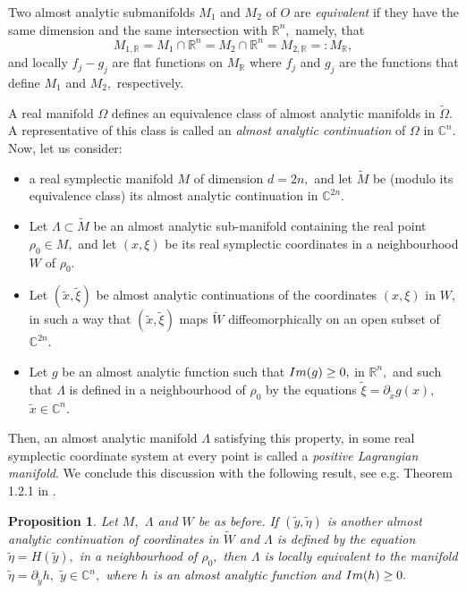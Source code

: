 \documentclass[12pt, reqno]{amsart}
\newtheorem{proposition}[theorem]{Proposition}
\theoremstyle{definition}
\theoremstyle{remark}
\numberwithin{equation}{section}
\begin{document}
Two almost analytic submanifolds $M_1$ and $M_2$ of $O$ are {\it equivalent} if they have the same dimension and the same intersection with $\mathbb{R}^n,$ namely, that $$M_{1,\mathbb{R}}=M_1\cap \mathbb{R}^n=M_2\cap \mathbb{R}^n=M_{2,\mathbb{R}}=:M_{\mathbb{R}},$$ and locally $f_j-g_j$ are flat functions on $M_{\mathbb{R}}$ where $f_j$ and $g_j$ are the functions that define $M_1$ and $M_2,$ respectively. 

A real manifold $\Omega$ defines an equivalence class of almost analytic manifolds in $\tilde{\Omega}.$ A representative of this class is called an {\it almost analytic continuation } of $\Omega$ in $\mathbb{C}^n.$
Now, let us consider:
\begin{itemize}
    \item a real symplectic manifold $M$ of dimension $d=2n,$ and let $\tilde{M}$ be (modulo its equivalence class) its almost analytic continuation in $\mathbb{C}^{2n}.$
    \item Let $\Lambda\subset \tilde{M}$ be an almost analytic sub-manifold containing the real point $\rho_0\in M,$ and let $(x,\xi)$ be its real symplectic coordinates in a neighbourhood $W$ of $\rho_0.$ 
    \item Let $(\tilde{x},\tilde{\xi})$ be almost analytic continuations of the coordinates $(x,\xi)$ in $W,$ in such a way that $(\tilde{x},\tilde{\xi})$ maps $ \tilde{W}$  diffeomorphically on an open subset of $\mathbb{C}^{2n}.$
    \item Let $g$ be an almost analytic function such that $\textnormal{Im}(g)\geq 0,$ in $\mathbb{R}^n,$ and such that $\Lambda$ is defined in a neighbourhood of $\rho_0$ by the equations $\tilde{\xi}=\partial_{\tilde{x}}g(x),$ $\tilde{x}\in \mathbb{C}^n.$
\end{itemize}
Then, an almost analytic manifold $\Lambda$ satisfying this property, in some real symplectic coordinate system at every point is called a {\it positive Lagrangian manifold}. We conclude this discussion with the following result,  see e.g. Theorem 1.2.1 in \cite{Ruzhansky:CWI-book}.
\begin{proposition}
    Let $M,$ $\Lambda$ and $W$ be as before. If $(\tilde y, \tilde \eta)$ is another almost analytic continuation of coordinates in $\tilde{W}$ and $\Lambda$ is defined by the equation $\tilde\eta=H(\tilde y),$ in a neighbourhood of $\rho_0,$ then $\Lambda$ is locally equivalent to the manifold $\tilde{\eta}=\partial_{\tilde y}h,$ $\tilde{y}\in \mathbb{C}^n,$ where $h$ is an almost analytic function and $\textnormal{Im}(h)\geq 0.$
\end{proposition}
\end{document}
